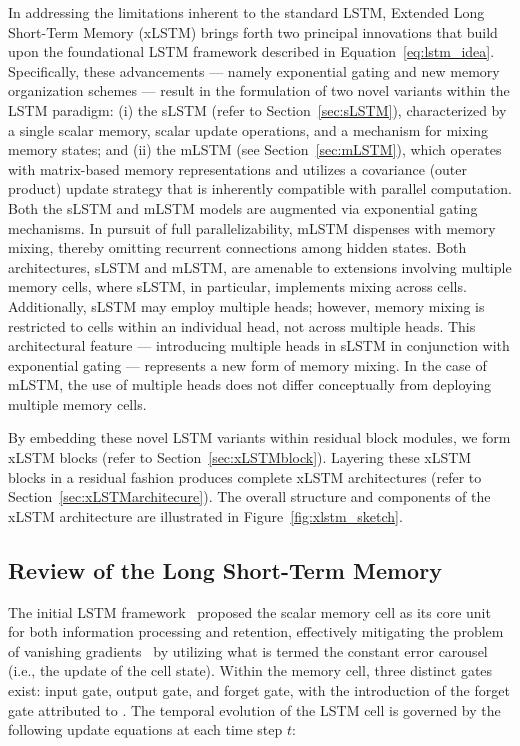 In addressing the limitations inherent to the standard LSTM, Extended Long Short-Term Memory (xLSTM) brings forth two principal innovations that build upon the foundational LSTM framework described in Equation~\eqref{eq:lstm_idea}. Specifically, these advancements — namely exponential gating and new memory organization schemes — result in the formulation of two novel variants within the LSTM paradigm: (i) the sLSTM (refer to Section~\ref{sec:sLSTM}), characterized by a single scalar memory, scalar update operations, and a mechanism for mixing memory states; and (ii) the mLSTM (see Section~\ref{sec:mLSTM}), which operates with matrix-based memory representations and utilizes a covariance (outer product) update strategy that is inherently compatible with parallel computation. Both the sLSTM and mLSTM models are augmented via exponential gating mechanisms. In pursuit of full parallelizability, mLSTM dispenses with memory mixing, thereby omitting recurrent connections among hidden states. Both architectures, sLSTM and mLSTM, are amenable to extensions involving multiple memory cells, where sLSTM, in particular, implements mixing across cells. Additionally, sLSTM may employ multiple heads; however, memory mixing is restricted to cells within an individual head, not across multiple heads. This architectural feature — introducing multiple heads in sLSTM in conjunction with exponential gating — represents a new form of memory mixing. In the case of mLSTM, the use of multiple heads does not differ conceptually from deploying multiple memory cells.

By embedding these novel LSTM variants within residual block modules, we form xLSTM blocks (refer to Section~\ref{sec:xLSTMblock}). Layering these xLSTM blocks in a residual fashion produces complete xLSTM architectures (refer to Section~\ref{sec:xLSTMarchitecure}). The overall structure and components of the xLSTM architecture are illustrated in Figure~\ref{fig:xlstm_sketch}.

\subsection{Review of the Long Short-Term Memory}
\label{sec:orgLSTM}

The initial LSTM framework~\citep{Hochreiter:91,Hochreiter:97nips,Hochreiter:97} proposed the scalar memory cell as its core unit for both information processing and retention, effectively mitigating the problem of vanishing gradients~\citep{Hochreiter:91,Hochreiter:00book} by utilizing what is termed the constant error carousel (i.e., the update of the cell state). Within the memory cell, three distinct gates exist: input gate, output gate, and forget gate, with the introduction of the forget gate attributed to \citet{Gers:00}. The temporal evolution of the LSTM cell is governed by the following update equations at each time step $t$:

